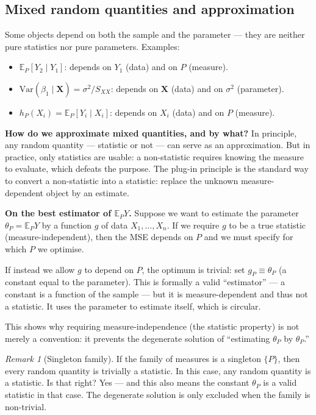 \documentclass[a4paper,oneside,12pt]{extarticle}
\theoremstyle{plain}
\theoremstyle{definition}
\theoremstyle{remark}
\newtheorem{remark}[proposition]{Remark}
\newcommand*{\E}{\mathbb{E}}
\newcommand*{\Var}{\mathrm{Var}}
\begin{document}
\subsection{Mixed random quantities and approximation}

Some objects depend on both the sample and the parameter --- they are
neither pure statistics nor pure parameters. Examples:
\begin{itemize}
  \item $\E_P[Y_2 \mid Y_1]$: depends on $Y_1$ (data) and on $P$
        (measure).
  \item $\Var(\hat\beta_1 \mid \mathbf{X}) = \sigma^2/S_{XX}$: depends
        on $\mathbf{X}$ (data) and on $\sigma^2$ (parameter).
  \item $h_P(X_i) = \E_P[Y_i \mid X_i]$: depends on $X_i$ (data) and
        on $P$ (measure).
\end{itemize}

\textbf{How do we approximate mixed quantities, and by what?}
In principle, any random quantity --- statistic or not --- can serve
as an approximation. But in practice, only statistics are usable: a
non-statistic requires knowing the measure to evaluate, which defeats
the purpose. The plug-in principle is the standard way to convert a
non-statistic into a statistic: replace the unknown measure-dependent
object by an estimate.

\textbf{On the best estimator of $\E_P Y$.}
Suppose we want to estimate the parameter $\theta_P = \E_P Y$ by a
function $g$ of data $X_1,\ldots,X_n$. If we require $g$ to be a
true statistic (measure-independent), then the MSE depends on $P$
and we must specify for which $P$ we optimise.

If instead we allow $g$ to depend on $P$, the optimum is trivial:
set $g_P \equiv \theta_P$ (a constant equal to the parameter). This
is formally a valid ``estimator'' --- a constant is a function of the
sample --- but it is measure-dependent and thus not a statistic.
It uses the parameter to estimate itself, which is circular.

This shows why requiring measure-independence (the statistic property)
is not merely a convention: it prevents the degenerate solution of
``estimating $\theta_P$ by $\theta_P$.''

\begin{remark}[Singleton family]
If the family of measures is a singleton $\{P\}$, then every random
quantity is trivially a statistic. In this case, any random quantity is a
statistic. Is that right? Yes --- and this also means the constant
$\theta_P$ is a valid statistic in that case. The degenerate solution
is only excluded when the family is non-trivial.
\end{remark}
\end{document}
